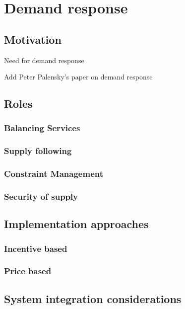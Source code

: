 \chapter{Demand response}

\section{Motivation}
Need for demand response

Add Peter Palensky's paper on demand response

\section{Roles}

\subsection{Balancing Services}

\subsection{Supply following}

\subsection{Constraint Management}

\subsection{Security of supply}



\section{Implementation approaches}

\subsection{Incentive based}

\subsection{Price based}




\section{System integration considerations}
